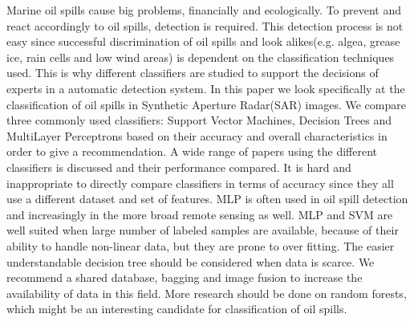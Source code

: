 Marine oil spills cause big problems, financially and ecologically. To prevent and react accordingly to oil spills, detection is required. This detection process is not easy since successful discrimination of oil spills and look alikes(e.g. algea, grease ice, rain cells and low wind areas) is dependent on the classification techniques used. This is why different classifiers are studied to support the decisions of experts in a automatic detection system. In this paper we look specifically at the classification of oil spills in Synthetic Aperture Radar(SAR) images. We compare three commonly used classifiers: Support Vector Machines, Decision Trees and MultiLayer Perceptrons based on their accuracy and overall characteristics in order to give a recommendation. A wide range of papers using the different classifiers is discussed and their performance compared. It is hard and inappropriate to directly compare classifiers in terms of accuracy since they all use a different dataset and set of features. MLP is often used in oil spill detection and increasingly in the more broad remote sensing as well. MLP and SVM are well suited when large number of labeled samples are available, because of their ability to handle non-linear data, but they are prone to over fitting. The easier understandable decision tree should be considered when data is scarce. We recommend a shared database, bagging and image fusion to increase the availability of data in this field. More research should be done on random forests, which might be an interesting candidate for classification of oil spills.

